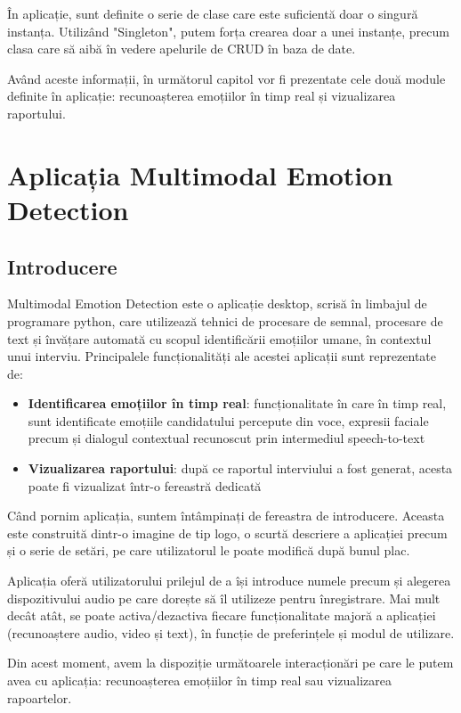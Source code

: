\documentclass[a4paper, 12pt]{report}
\begin{document}
	În aplicație, sunt definite o serie de clase care este suficientă doar o singură instanța. Utilizând "Singleton", putem forța crearea doar a unei instanțe, precum clasa care să aibă în vedere apelurile de CRUD în baza de date. 
	
	Având aceste informații, în următorul capitol vor fi prezentate cele două module definite în aplicație: recunoașterea emoțiilor în timp real și vizualizarea raportului.
	
	\clearpage
	\section{Aplicația Multimodal Emotion Detection}
	\subsection{Introducere}
	
	Multimodal Emotion Detection este o aplicație desktop, scrisă în limbajul de programare python, care utilizează tehnici de procesare de semnal, procesare de text și învățare automată cu scopul identificării emoțiilor umane, în contextul unui interviu. Principalele funcționalități ale acestei aplicații sunt reprezentate de:
	\begin{itemize}
	 	\item \textbf{Identificarea emoțiilor în timp real}: funcționalitate în care în timp real, sunt identificate emoțiile candidatului percepute din voce, expresii faciale precum și dialogul contextual recunoscut prin intermediul speech-to-text
		\item \textbf{Vizualizarea raportului}: după ce raportul interviului a fost generat, acesta poate fi vizualizat într-o fereastră dedicată
	\end{itemize}

	Când pornim aplicația, suntem întâmpinați de fereastra de introducere. Aceasta este construită dintr-o imagine de tip logo, o scurtă descriere a aplicației precum și o serie de setări, pe care utilizatorul le poate modifică după bunul plac.
	
	Aplicația oferă utilizatorului prilejul de a își introduce numele precum și alegerea dispozitivului audio pe care dorește să îl utilizeze pentru înregistrare. Mai mult decât atât, se poate activa/dezactiva fiecare funcționalitate majoră a aplicației (recunoaștere audio, video și text), în funcție de preferințele și modul de utilizare.
	
	Din acest moment, avem la dispoziție următoarele interacționări pe care le putem avea cu aplicația: recunoașterea emoțiilor în timp real sau vizualizarea rapoartelor.
	
\end{document}
